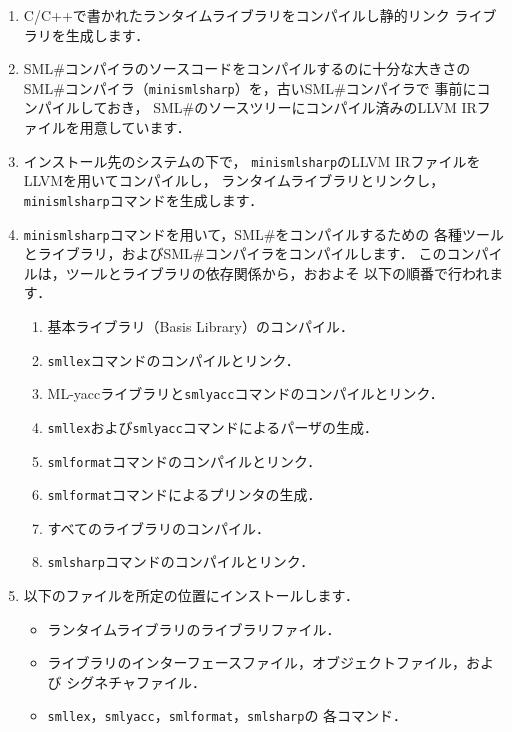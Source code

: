 \documentclass{jbook}
\newcommand{\smlsharp}{SML\#}
\begin{document}
\begin{enumerate}
\item
	C/C++で書かれたランタイムライブラリをコンパイルし静的リンク
ライブラリを生成します．
\item
	\smlsharp{}コンパイラのソースコードをコンパイルするのに十分な大きさの
\smlsharp{}コンパイラ（{\tt minismlsharp}）を，古い\smlsharp{}コンパイラで
事前にコンパイルしておき，
\smlsharp{}のソースツリーにコンパイル済みのLLVM IRファイルを用意しています．
\item
	インストール先のシステムの下で，
{\tt minismlsharp}のLLVM IRファイルをLLVMを用いてコンパイルし，
ランタイムライブラリとリンクし，
{\tt minismlsharp}コマンドを生成します．
\item
	{\tt minismlsharp}コマンドを用いて，\smlsharp{}をコンパイルするための
各種ツールとライブラリ，および\smlsharp{}コンパイラをコンパイルします．
	このコンパイルは，ツールとライブラリの依存関係から，おおよそ
以下の順番で行われます．
\begin{enumerate}
\item 基本ライブラリ（Basis Library）のコンパイル．
\item {\tt smllex}コマンドのコンパイルとリンク．
\item ML-yaccライブラリと{\tt smlyacc}コマンドのコンパイルとリンク．
\item {\tt smllex}および{\tt smlyacc}コマンドによるパーザの生成．
\item {\tt smlformat}コマンドのコンパイルとリンク．
\item {\tt smlformat}コマンドによるプリンタの生成．
\item すべてのライブラリのコンパイル．
\item {\tt smlsharp}コマンドのコンパイルとリンク．
\end{enumerate}
\item 以下のファイルを所定の位置にインストールします．
\begin{itemize}
\item ランタイムライブラリのライブラリファイル．
\item ライブラリのインターフェースファイル，オブジェクトファイル，および
シグネチャファイル．
\item {\tt smllex}，{\tt smlyacc}，{\tt smlformat}，{\tt smlsharp}の
各コマンド．
\end{itemize}
\end{enumerate}
\end{document}
